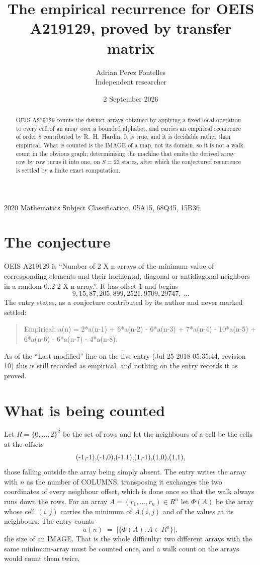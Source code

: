 \documentclass[11pt,a4paper]{article}
\title{The empirical recurrence for OEIS A219129, proved by transfer matrix}
\author{Adrian Perez Fontelles\\ \small Independent researcher}
\date{2 September 2026}
\theoremstyle{plain}
\theoremstyle{definition}
\begin{document}
\maketitle

\begin{abstract}
OEIS A219129 counts the distinct arrays obtained by applying a fixed local operation to every cell
of an array over a bounded alphabet, and carries an empirical recurrence of order $8$
contributed by R.~H.~Hardin. It is true, and it is decidable rather than empirical. What is
counted is the IMAGE of a map, not its domain, so it is not a walk count in the obvious graph;
determinising the machine that emits the derived array row by row turns it into one, on
$S=23$ states, after which the conjectured recurrence is settled by a finite exact
computation.
\end{abstract}

\noindent\small 2020 Mathematics Subject Classification. 05A15, 68Q45, 15B36.\normalsize

\section{The conjecture}

OEIS A219129 is ``Number of 2 X n arrays of the minimum value of corresponding elements and their horizontal, diagonal or antidiagonal neighbors in a random 0..2 2 X n array.''. It has offset $1$ and begins
\[
9, 15, 87, 205, 899, 2521, 9709, 29747,\ \dots
\]
The entry states, as a conjecture contributed by its author and never marked settled:
\begin{quote}
Empirical: a(n) = 2*a(n-1) + 6*a(n-2) - 6*a(n-3) + 7*a(n-4) - 10*a(n-5) + 6*a(n-6) - 6*a(n-7) - 4*a(n-8).
\end{quote}
As of the ``Last modified'' line on the live entry (Jul 25 2018 05:35:44, revision 10) this is still
recorded as empirical, and nothing on the entry records it as proved.

\section{What is being counted}

Let $R=\{0,\dots,2\}^{2}$ be the set of rows and let the neighbours of
a cell be the cells at the offsets
\[
$(-1,-1)$, $(-1,0)$, $(-1,1)$, $(1,-1)$, $(1,0)$, $(1,1)$,
\]
those falling outside the array being simply absent. The entry writes the array with $n$ as the number of COLUMNS; transposing it exchanges the two coordinates of every neighbour offset, which is done once so that the walk always runs down the rows. For an array
$A=(r_1,\dots,r_n)\in R^n$ let $\Phi(A)$ be the array whose cell $(i,j)$ carries the
minimum of $A(i,j)$ and of the values at its neighbours. The entry counts
\[
a(n)\;=\;\bigl|\{\Phi(A):A\in R^n\}\bigr| ,
\]
the size of an IMAGE. That is the whole difficulty: two different arrays with the same
minimum-array must be counted once, and a walk count on the arrays would count them twice.
\end{document}
